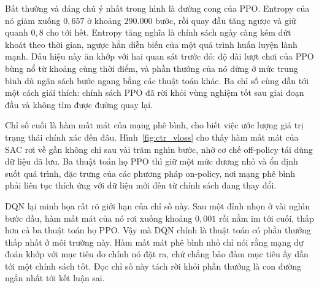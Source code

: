 \indent Bất thường và đáng chú ý nhất trong hình là đường cong của PPO. Entropy của nó
giảm xuống $0{,}657$ ở khoảng $290.000$ bước, rồi quay đầu tăng ngược và
giữ quanh $0{,}8$ cho tới hết. Entropy tăng nghĩa là chính sách ngày càng kém dứt khoát
theo thời gian, ngược hẳn diễn biến của một quá trình huấn luyện lành mạnh. Dấu hiệu này
ăn khớp với hai quan sát trước đó: độ dài lượt chơi của PPO bùng nổ từ khoảng cùng thời
điểm, và phần thưởng của nó dừng ở mức trung bình dù ngân sách bước ngang bằng các thuật
toán khác. Ba chỉ số cùng dẫn tới một cách giải thích: chính sách PPO đã rời khỏi vùng
nghiệm tốt sau giai đoạn đầu và không tìm được đường quay lại.

\indent Chỉ số cuối là hàm mất mát của mạng phê bình, cho biết việc ước lượng giá trị
trạng thái chính xác đến đâu. Hình~\ref{fig:ctr_vloss} cho thấy hàm mất mát của SAC rơi về
gần không chỉ sau vài trăm nghìn bước, nhờ cơ chế off-policy tái dùng dữ liệu đã lưu. Ba
thuật toán họ PPO thì giữ một mức dương nhỏ và ổn định suốt quá trình, đặc trưng của các
phương pháp on-policy, nơi mạng phê bình phải liên tục thích ứng với dữ liệu mới đến từ
chính sách đang thay đổi.

\indent DQN lại minh họa rất rõ giới hạn của chỉ số này. Sau một đỉnh nhọn ở vài nghìn
bước đầu, hàm mất mát của nó rơi xuống khoảng $0{,}001$ rồi nằm im tới cuối, thấp hơn cả
ba thuật toán họ PPO. Vậy mà DQN chính là thuật toán có phần thưởng thấp nhất ở môi trường
này. Hàm mất mát phê bình nhỏ chỉ nói rằng mạng dự đoán khớp với mục tiêu do chính nó đặt
ra, chứ chẳng bảo đảm mục tiêu ấy dẫn tới một chính sách tốt. Đọc chỉ số này tách rời khỏi
phần thưởng là con đường ngắn nhất tới kết luận sai.

